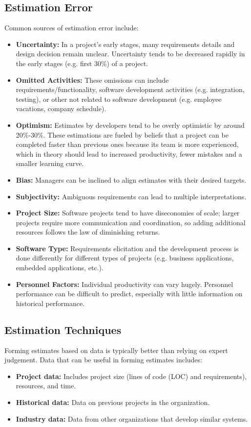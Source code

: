 \documentclass[12pt,titlepage]{article}
\begin{document}
    \subsection{Estimation Error}
      Common sources of estimation error include:
      \begin{itemize}
        \item \textbf{Uncertainty:} In a project's early stages, many requirements details and design decision remain unclear. Uncertainty tends to be decreased
          rapidly in the early stages (e.g. first 30\%) of a project.
        \item \textbf{Omitted Activities:} These omissions can include requirements/functionality, software development activities (e.g. integration, testing),
          or other not related to software development (e.g. employee vacations, company schedule).
        \item \textbf{Optimism:} Estimates by developers tend to be overly optimistic by around 20\%-30\%. These estimations are fueled by beliefs that a
          project can be completed faster than previous ones because its team is more experienced, which in theory should lead to increased productivity,
          fewer mistakes and a smaller learning curve.
        \item \textbf{Bias:} Managers can be inclined to align estimates with their desired targets.
        \item \textbf{Subjectivity:} Ambiguous requirements can lead to multiple interpretations.
        \item \textbf{Project Size:} Software projects tend to have diseconomies of scale; larger projects require more communication and coordination,
          so adding additional resources follows the law of diminishing returns.
        \item \textbf{Software Type:} Requirements elicitation and the development process is done differently for different types of projects
          (e.g. business applications, embedded applications, etc.).
        \item \textbf{Personnel Factors:} Individual productivity can vary hugely. Personnel performance can be difficult to predict, especially with
          little information on historical performance.
      \end{itemize}

    \subsection{Estimation Techniques}
      Forming estimates based on data is typically better than relying on expert judgement. Data that can be useful in forming estimates includes:
      \begin{itemize}
        \item \textbf{Project data:} Includes project size (lines of code (LOC) and requirements), resources, and time.
        \item \textbf{Historical data:} Data on previous projects in the organization.
        \item \textbf{Industry data:} Data from other organizations that develop similar systems.
      \end{itemize}
\end{document}
